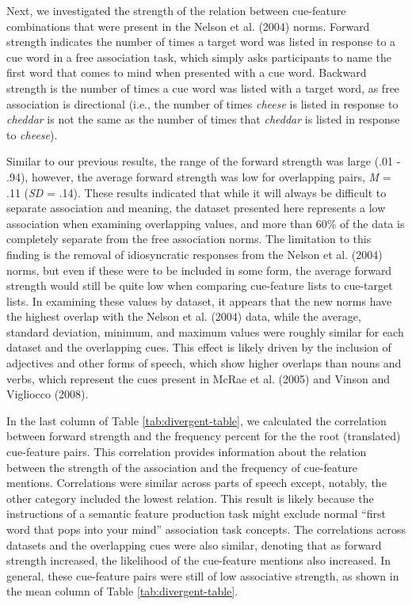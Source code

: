 \documentclass[english,,man]{apa6}
\begin{document}
Next, we investigated the strength of the relation between cue-feature combinations that were present in the Nelson et al. (2004) norms. Forward strength indicates the number of times a target word was listed in response to a cue word in a free association task, which simply asks participants to name the first word that comes to mind when presented with a cue word. Backward strength is the number of times a cue word was listed with a target word, as free association is directional (i.e., the number of times \emph{cheese} is listed in response to \emph{cheddar} is not the same as the number of times that \emph{cheddar} is listed in response to \emph{cheese}).

Similar to our previous results, the range of the forward strength was large (.01 - .94), however, the average forward strength was low for overlapping pairs, \emph{M} = .11 (\emph{SD} = .14). These results indicated that while it will always be difficult to separate association and meaning, the dataset presented here represents a low association when examining overlapping values, and more than 60\% of the data is completely separate from the free association norms. The limitation to this finding is the removal of idiosyncratic responses from the Nelson et al. (2004) norms, but even if these were to be included in some form, the average forward strength would still be quite low when comparing cue-feature lists to cue-target lists. In examining these values by dataset, it appears that the new norms have the highest overlap with the Nelson et al. (2004) data, while the average, standard deviation, minimum, and maximum values were roughly similar for each dataset and the overlapping cues. This effect is likely driven by the inclusion of adjectives and other forms of speech, which show higher overlaps than nouns and verbs, which represent the cues present in McRae et al. (2005) and Vinson and Vigliocco (2008).

In the last column of Table \ref{tab:divergent-table}, we calculated the correlation between forward strength and the frequency percent for the the root (translated) cue-feature pairs. This correlation provides information about the relation between the strength of the association and the frequency of cue-feature mentions. Correlations were similar across parts of speech except, notably, the other category included the lowest relation. This result is likely because the instructions of a semantic feature production task might exclude normal \enquote{first word that pops into your mind} association task concepts. The correlations across datasets and the overlapping cues were also similar, denoting that as forward strength increased, the likelihood of the cue-feature mentions also increased. In general, these cue-feature pairs were still of low associative strength, as shown in the mean column of Table \ref{tab:divergent-table}.
\end{document}
